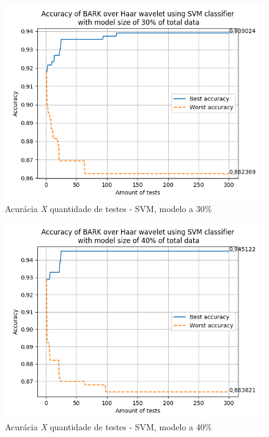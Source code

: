 \begin{myenv}{1.5}
		\newpage
		\begin{figure}[h]
			\centering
			\includegraphics{images/results/confusionMatrices/classifier_SVM_30.png}
			\caption{Acurácia \textit{X} quantidade de testes - SVM, modelo a 30\%}
			\label{fig:classifiersvm30}
		\end{figure}
		
	
		\newpage
		\begin{figure}[h]
			\centering
			\includegraphics{images/results/confusionMatrices/classifier_SVM_40.png}
			\caption{Acurácia \textit{X} quantidade de testes - SVM, modelo a 40\%}
			\label{fig:classifiersvm40}
		\end{figure}
		
	

\end{myenv}
